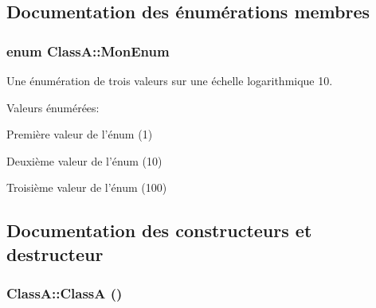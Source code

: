 \subsection{Documentation des énumérations membres}
\hypertarget{class_class_a_aebd12939da3b00aca5f7c04a0f34f0d4}{
\subsubsection[{MonEnum}]{\setlength{\rightskip}{0pt plus 5cm}enum {\bf ClassA::MonEnum}}}
\label{class_class_a_aebd12939da3b00aca5f7c04a0f34f0d4}


Une énumération de trois valeurs sur une échelle logarithmique 10. \begin{Desc}
\item[Valeurs énumérées: ]\par
\begin{description}
\item[{\em 
\hypertarget{class_class_a_aebd12939da3b00aca5f7c04a0f34f0d4a9db1f0ab44af74bb349827f67c63835d}{
VAL1}
\label{class_class_a_aebd12939da3b00aca5f7c04a0f34f0d4a9db1f0ab44af74bb349827f67c63835d}
}]Première valeur de l'énum (1) \item[{\em 
\hypertarget{class_class_a_aebd12939da3b00aca5f7c04a0f34f0d4a2aa208680503684c42107f008350be56}{
VAL2}
\label{class_class_a_aebd12939da3b00aca5f7c04a0f34f0d4a2aa208680503684c42107f008350be56}
}]Deuxième valeur de l'énum (10) \item[{\em 
\hypertarget{class_class_a_aebd12939da3b00aca5f7c04a0f34f0d4ab9438dfedb4070dba86d8dfaf4562851}{
VAL3}
\label{class_class_a_aebd12939da3b00aca5f7c04a0f34f0d4ab9438dfedb4070dba86d8dfaf4562851}
}]Troisième valeur de l'énum (100) \end{description}
\end{Desc}



\subsection{Documentation des constructeurs et destructeur}
\hypertarget{class_class_a_acd165fa87ae77eeb9c715024c0301a6b}{
\subsubsection[{ClassA}]{\setlength{\rightskip}{0pt plus 5cm}ClassA::ClassA ()}}
\label{class_class_a_acd165fa87ae77eeb9c715024c0301a6b}


